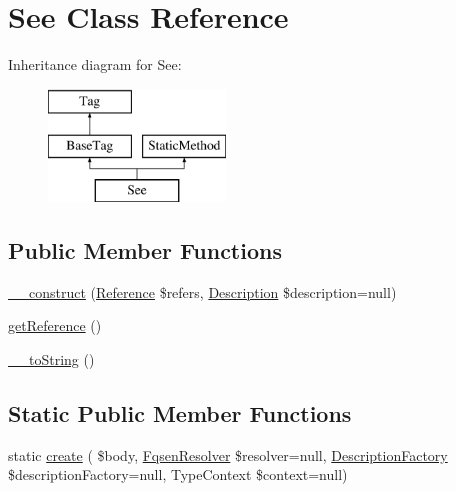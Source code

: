 \hypertarget{classphp_documentor_1_1_reflection_1_1_doc_block_1_1_tags_1_1_see}{}\section{See Class Reference}
\label{classphp_documentor_1_1_reflection_1_1_doc_block_1_1_tags_1_1_see}
Inheritance diagram for See\+:\begin{figure}[H]
\begin{center}
\leavevmode
\includegraphics[height=3.000000cm]{classphp_documentor_1_1_reflection_1_1_doc_block_1_1_tags_1_1_see}
\end{center}
\end{figure}
\subsection*{Public Member Functions}
\begin{DoxyCompactItemize}
\item 
\mbox{\hyperlink{classphp_documentor_1_1_reflection_1_1_doc_block_1_1_tags_1_1_see_aba0c573d8d874e5345c111c6ab60f925}{\+\_\+\+\_\+construct}} (\mbox{\hyperlink{interfacephp_documentor_1_1_reflection_1_1_doc_block_1_1_tags_1_1_reference_1_1_reference}{Reference}} \$refers, \mbox{\hyperlink{classphp_documentor_1_1_reflection_1_1_doc_block_1_1_description}{Description}} \$description=null)
\item 
\mbox{\hyperlink{classphp_documentor_1_1_reflection_1_1_doc_block_1_1_tags_1_1_see_a1f54573d48e07a7250b74f80b8493f1d}{get\+Reference}} ()
\item 
\mbox{\hyperlink{classphp_documentor_1_1_reflection_1_1_doc_block_1_1_tags_1_1_see_a7516ca30af0db3cdbf9a7739b48ce91d}{\+\_\+\+\_\+to\+String}} ()
\end{DoxyCompactItemize}
\subsection*{Static Public Member Functions}
\begin{DoxyCompactItemize}
\item 
static \mbox{\hyperlink{classphp_documentor_1_1_reflection_1_1_doc_block_1_1_tags_1_1_see_a7722e68bb1d72775a140867f125d2483}{create}} ( \$body, \mbox{\hyperlink{classphp_documentor_1_1_reflection_1_1_fqsen_resolver}{Fqsen\+Resolver}} \$resolver=null, \mbox{\hyperlink{classphp_documentor_1_1_reflection_1_1_doc_block_1_1_description_factory}{Description\+Factory}} \$description\+Factory=null, Type\+Context \$context=null)
\end{DoxyCompactItemize}
